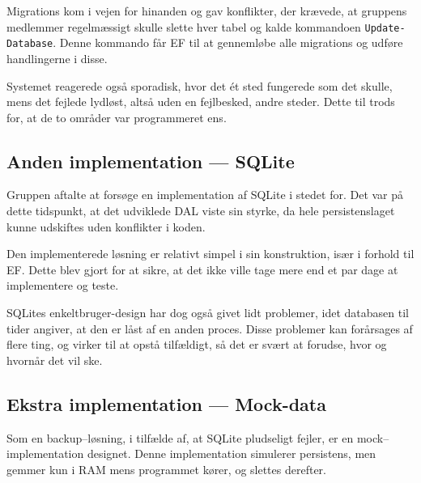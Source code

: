 Migrations kom i vejen for hinanden og gav konflikter, der krævede, at gruppens medlemmer regelmæssigt skulle slette hver tabel og kalde kommandoen \texttt{Update-Database}.
Denne kommando får \ac{EF} til at gennemløbe alle migrations og udføre handlingerne i disse.

Systemet reagerede også sporadisk, hvor det ét sted fungerede som det skulle, mens det fejlede lydløst, altså uden en fejlbesked, andre steder.
Dette til trods for, at de to områder var programmeret ens.

\subsection{Anden implementation --- SQLite}

Gruppen aftalte at forsøge en implementation af SQLite i stedet for.
Det var på dette tidspunkt, at det udviklede \acl{DAL} viste sin styrke, da hele persistenslaget kunne udskiftes uden konflikter i koden.

Den implementerede løsning er relativt simpel i sin konstruktion, især i forhold til \acl{EF}.
Dette blev gjort for at sikre, at det ikke ville tage mere end et par dage at implementere og teste.

SQLites enkeltbruger-design har dog også givet lidt problemer, idet databasen til tider angiver, at den er låst af en anden proces.
Disse problemer kan forårsages af flere ting, og virker til at opstå tilfældigt, så det er svært at forudse, hvor og hvornår det vil ske.

\subsection{Ekstra implementation --- Mock-data}

Som en backup--løsning, i tilfælde af, at SQLite pludseligt fejler, er en mock--implementation designet.
Denne implementation simulerer persistens, men gemmer kun i RAM mens programmet kører, og slettes derefter.


